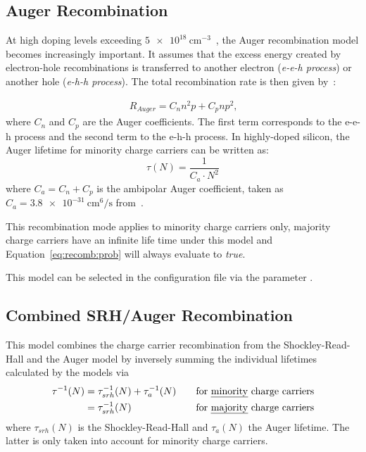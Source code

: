 \subsection{Auger Recombination}

At high doping levels exceeding $\SI{5e18}{\centi\metre^{-3}}$~\cite{FOSSUM1983569}, the Auger recombination model becomes increasingly important.
It assumes that the excess energy created by electron-hole recombinations is transferred to another electron (\textit{e-e-h process}) or another hole (\textit{e-h-h process}).
The total recombination rate is then given by~\cite{kerr}:

\begin{align*}
	R_{Auger} = C_n n^2p + C_p n p^2\textrm{,}
\end{align*}
where $C_n$ and $C_p$ are the Auger coefficients.
The first term corresponds to the e-e-h process and the second term to the e-h-h process.
In highly-doped silicon, the Auger lifetime for minority charge carriers can be written as:
\begin{equation}
    \tau(N) = \frac{1}{C_{a} \cdot N^2}
\end{equation}
where $C_{a} = C_{n} + C_{p}$ is the ambipolar Auger coefficient, taken as $C_{a} = \SI{3.8e-31}{\cm^6 \per \s}$ from~\cite{dziewior}.

This recombination mode applies to minority charge carriers only, majority charge carriers have an infinite life time under this model and Equation~\eqref{eq:recomb:prob} will always evaluate to \emph{true}.

This model can be selected in the configuration file via the parameter .

\subsection{Combined SRH/Auger Recombination}

This model combines the charge carrier recombination from the Shockley-Read-Hall and the Auger model by inversely summing the individual lifetimes calculated by the models via
\begin{align}
    \label{eq:recom:combined}
    \tau^{-1}(N) &= \tau_{srh}^{-1}(N) + \tau_{a}^{-1}(N) &\quad \textrm{for \emph{minority} charge carriers} \nonumber \\
              &= \tau_{srh}^{-1}(N) &\quad \textrm{for \emph{majority} charge carriers}
\end{align}
where $\tau_{srh}(N)$ is the Shockley-Read-Hall and $\tau_{a}(N)$ the Auger lifetime.
The latter is only taken into account for minority charge carriers.

